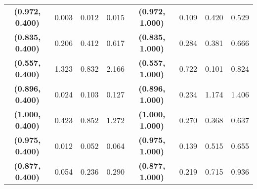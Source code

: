 \begin{table}[H]
{\begin{tabular}{@{}clllc|lll@{}}
\textbf{(0.972, 0.400)}   & 0.003                 & 0.012                   & 0.015                   & \textbf{(0.972, 1.000)}   & 0.109                 & 0.420                   & 0.529                   \\
\textbf{(0.835, 0.400)}   & 0.206                 & 0.412                   & 0.617                   & \textbf{(0.835, 1.000)}   & 0.284                 & 0.381                   & 0.666                   \\
\textbf{(0.557, 0.400)}   & 1.323                 & 0.832                   & 2.166                   & \textbf{(0.557, 1.000)}   & 0.722                 & 0.101                   & 0.824                   \\
\textbf{(0.896, 0.400)}   & 0.024                 & 0.103                   & 0.127                   & \textbf{(0.896, 1.000)}   & 0.234                 & 1.174                   & 1.406                   \\
\textbf{(1.000, 0.400)}   & 0.423                 & 0.852                   & 1.272                   & \textbf{(1.000, 1.000)}   & 0.270                 & 0.368                   & 0.637                   \\
\textbf{(0.975, 0.400)}   & 0.012                 & 0.052                   & 0.064                   & \textbf{(0.975, 1.000)}   & 0.139                 & 0.515                   & 0.655                   \\
\textbf{(0.877,   0.400)} & 0.054                 & 0.236                   & 0.290                   & \textbf{(0.877, 1.000)}   & 0.219                 & 0.715                   & 0.936                   \\ \bottomrule
\end{tabular}%
}
\end{table}

